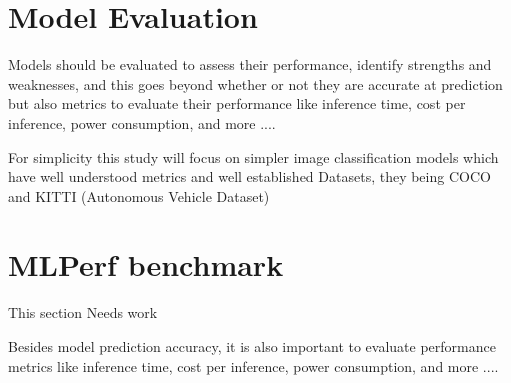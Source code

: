 \documentclass{article}
\begin{document}

\section{Model Evaluation}

Models should be evaluated to assess their performance, identify strengths and weaknesses, and this goes beyond whether or not they are accurate at prediction but also metrics to evaluate their performance like inference time, cost per inference, power consumption, and more ....

For simplicity this study will focus on simpler image classification models which have well understood metrics and well established Datasets, they being COCO and KITTI (Autonomous Vehicle Dataset)



\section{MLPerf benchmark}

This section Needs work

Besides model prediction accuracy, it is also important to evaluate performance metrics like inference time, cost per inference, power consumption, and more ....
\end{document}

